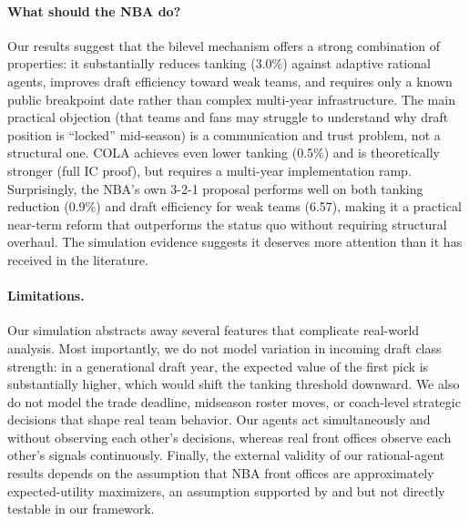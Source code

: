 \documentclass{article}
\begin{document}
\paragraph{What should the NBA do?}
Our results suggest that the bilevel mechanism offers a strong combination
of properties: it substantially reduces tanking (3.0\%) against adaptive
rational agents, improves draft efficiency toward weak teams, and requires
only a known public breakpoint date rather than complex multi-year
infrastructure.
The main practical objection (that teams and fans may struggle to understand
why draft position is ``locked'' mid-season) is a communication and trust
problem, not a structural one.
COLA achieves even lower tanking (0.5\%) and is theoretically stronger (full
IC proof), but requires a multi-year implementation ramp.
Surprisingly, the NBA's own 3-2-1 proposal performs well on both tanking
reduction (0.9\%) and draft efficiency for weak teams (6.57), making it a
practical near-term reform that outperforms the status quo without requiring
structural overhaul.
The simulation evidence suggests it deserves more attention than it has
received in the literature.

\paragraph{Limitations.}
Our simulation abstracts away several features that complicate real-world
analysis.
Most importantly, we do not model variation in incoming draft class strength:
in a generational draft year, the expected value of the first pick is
substantially higher, which would shift the tanking threshold downward.
We also do not model the trade deadline, midseason roster moves, or
coach-level strategic decisions that shape real team behavior.
Our agents act simultaneously and without observing each other's decisions,
whereas real front offices observe each other's signals continuously.
Finally, the external validity of our rational-agent results depends on the
assumption that NBA front offices are approximately expected-utility
maximizers, an assumption supported by \citet{taylor2002} and
\citet{schmidt2024} but not directly testable in our framework.
\end{document}

